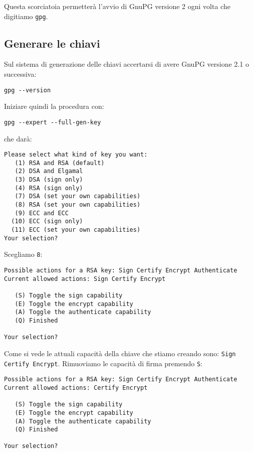 Questa scorciatoia permetterà l'avvio di GnuPG versione 2 ogni volta
che digitiamo \texttt{gpg}.

\subsection{Generare le chiavi}

Sul sistema di generazione delle chiavi accertarsi di avere GnuPG versione 2.1 o
successiva:

\begin{lstlisting}
gpg --version
\end{lstlisting}

Iniziare quindi la procedura con:

\begin{lstlisting}
gpg --expert --full-gen-key
\end{lstlisting}

che darà:

\begin{lstlisting}
Please select what kind of key you want:
   (1) RSA and RSA (default)
   (2) DSA and Elgamal
   (3) DSA (sign only)
   (4) RSA (sign only)
   (7) DSA (set your own capabilities)
   (8) RSA (set your own capabilities)
   (9) ECC and ECC
  (10) ECC (sign only)
  (11) ECC (set your own capabilities)
Your selection?
\end{lstlisting}

Scegliamo \texttt{8}:

\begin{lstlisting}
Possible actions for a RSA key: Sign Certify Encrypt Authenticate
Current allowed actions: Sign Certify Encrypt

   (S) Toggle the sign capability
   (E) Toggle the encrypt capability
   (A) Toggle the authenticate capability
   (Q) Finished

Your selection?
\end{lstlisting}

Come si vede le attuali capacità della chiave che stiamo creando sono:
\texttt{Sign Certify Encrypt}. Rimuoviamo le capacità di firma premendo
\texttt{S}:

\begin{lstlisting}
Possible actions for a RSA key: Sign Certify Encrypt Authenticate
Current allowed actions: Certify Encrypt

   (S) Toggle the sign capability
   (E) Toggle the encrypt capability
   (A) Toggle the authenticate capability
   (Q) Finished

Your selection?
\end{lstlisting}

